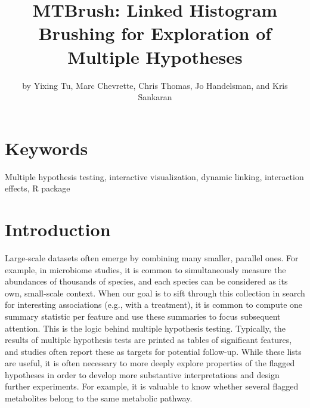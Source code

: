 \title{MTBrush: Linked Histogram Brushing for Exploration of Multiple
Hypotheses}
\author{by Yixing Tu, Marc Chevrette, Chris Thomas, Jo Handelsman, and Kris
Sankaran}

\maketitle


\hypertarget{keywords}{%
\section{Keywords}\label{keywords}}

Multiple hypothesis testing, interactive visualization, dynamic linking,
interaction effects, R package

\hypertarget{introduction}{%
\section{Introduction}\label{introduction}}

Large-scale datasets often emerge by combining many smaller, parallel
ones. For example, in microbiome studies, it is common to simultaneously
measure the abundances of thousands of species, and each species can be
considered as its own, small-scale context. When our goal is to sift
through this collection in search for interesting associations (e.g.,
with a treatment), it is common to compute one summary statistic per
feature and use these summaries to focus subsequent attention. This is
the logic behind multiple hypothesis testing. Typically, the results of
multiple hypothesis tests are printed as tables of significant features,
and studies often report these as targets for potential follow-up. While
these lists are useful, it is often necessary to more deeply explore
properties of the flagged hypotheses in order to develop more
substantive interpretations and design further experiments. For example,
it is valuable to know whether several flagged metabolites belong to the
same metabolic pathway.

